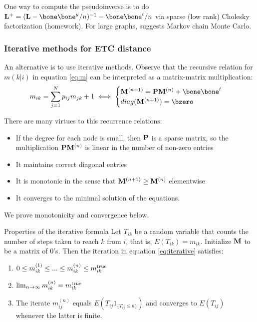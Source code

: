 \documentclass[./some_latex_template.tex]{subfiles}
\begin{document}
One way to compute the pseudoinverse is to do $\bL^+ = (\bL - \bone\bone^y/n)^{-1} - \bone\bone^t/n$ via sparse (low rank) Cholesky factorization \cite{fouss2007random} (homework). For large graphs, \citep{yen2005clustering} suggests Markov chain Monte Carlo. 

\subsubsection{Iterative methods for ETC distance}

An alternative is to use iterative methods. Observe that the recursive relation for $m(k|i)$ in equation \eqref{eq:m} can be interpreted as a matrix-matrix multiplication: 
\begin{align}\label{eq:iterative}
m_{ik} = \sum_{j=1}^Np_{ij}m_{jk} + 1 \iff \begin{cases}
	\bM^{(n+1)} = \bP\bM^{(n)} + \bone\bone^t\\
	diag(\bM^{(n+1)}) = \bzero
\end{cases}
\end{align}

\noindent There are many virtues to this recurrence relations: 
\begin{itemize}
	\item If the degree for each node is small, then $\mathbf{P}$ is a sparse matrix, so the multiplication $\mathbf{P}\mathbf{M}^{(n)}$ is linear in the number of non-zero entries
	\item It maintains correct diagonal entries
	\item It is monotonic in the sense that $\mathbf{M}^{(n + 1)} \geq \mathbf{M}^{(n)}$ elementwise
	\item It converges to the minimal solution of the equations. 
\end{itemize}

\noindent We prove monotonicity and convergence below.

\begin{theorembox}{Properties of the iterative formula}{}
Let $T_{ik}$ be a random variable that counts the number of steps taken to reach $k$ from $i$, that is, $E(T_{ik}) = m_{ik}$. Initialize $\mathbf{M}$ to be a matrix of $0$'s. Then the iteration in equation \eqref{eq:iterative} satisfies:
\begin{enumerate}
	\item $0 \le m_{ik}^{(1)} \le ... \le m_{ik}^{(n)} \le m_{ik}^{\rm true}$
	\item $\lim_{n \rightarrow \infty} m_{ik}^{(n)} = m_{ik}^{\rm true}$
	\item The iterate $m_{ij}^{(n)}$ equals $E(T_{ij}1_{\{T_{ij} \le n\}})$ and converges to $E(T_{ij})$ whenever the latter is finite. 
\end{enumerate}
\end{theorembox}
\end{document}
